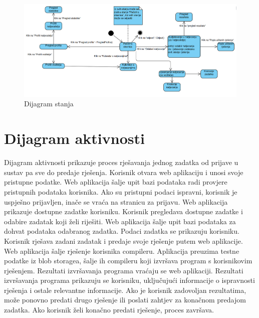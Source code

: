 				
			\begin{figure}[H]
				\includegraphics[width=\linewidth]{slike/dijagram_stanja.png} 
				\centering
				\caption{Dijagram stanja}
				\label{fig:stanja}
			\end{figure}
			
			\eject 
		
		\section{Dijagram aktivnosti}
			
			Dijagram aktivnosti prikazuje proces rješavanja jednog zadatka od prijave u sustav pa sve do predaje rješenja. Korisnik otvara web aplikaciju i unosi svoje pristupne podatke. Web aplikacija šalje upit bazi podataka radi provjere pristupnih podataka korisnika. Ako su pristupni podaci ispravni, korisnik je uspješno prijavljen, inače se vraća na stranicu za prijavu. Web aplikacija prikazuje dostupne zadatke korisniku. Korisnik pregledava dostupne zadatke i odabire zadatak koji želi riješiti. Web aplikacija šalje upit bazi podataka za dohvat podataka odabranog zadatka. Podaci zadatka se prikazuju korisniku. Korisnik rješava zadani zadatak i predaje svoje rješenje putem web aplikacije. Web aplikacija šalje rješenje korisnika compileru. Aplikacija preuzima testne podatke iz blob storagea, šalje ih compileru koji izvršava program s korisnikovim rješenjem. Rezultati izvršavanja programa vraćaju se web aplikaciji. Rezultati izvršavanja programa prikazuju se korisniku, uključujući informacije o ispravnosti rješenja i ostale relevantne informacije. Ako je korisnik zadovoljan rezultatima, može ponovno predati drugo rješenje ili poslati zahtjev za konačnom predajom zadatka. Ako korisnik želi konačno predati rješenje, proces završava.
			\eject
			
